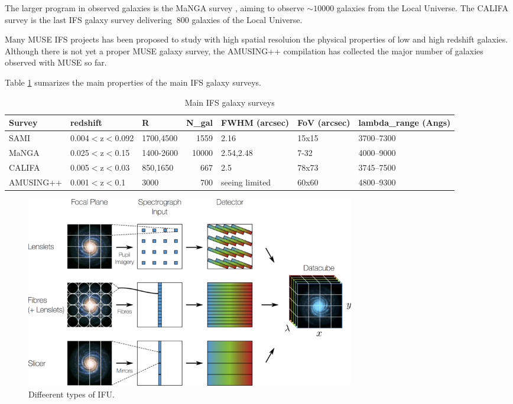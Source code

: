 The larger program in observed galaxies is the MaNGA survey \cite{mangaOLD}, aiming to observe $\sim 10000$ galaxies from the Local Universe. The CALIFA survey \cite{sanchez12a} is the last IFS galaxy
survey delivering $~800$ galaxies of the Local Universe. 

Many MUSE IFS projects has been proposed to study with high spatial resoluion the physical properties of low and high redshift galaxies. Although there is not yet a proper MUSE galaxy survey,
the AMUSING++ compilation has collected the major number of galaxies observed with MUSE so far. 

Table \ref{tab:IFS_properties} sumarizes the main properties of the main IFS galaxy surveys.

\begin{table} 
\begin{tabular}{lllrlll}
\toprule
 Survey    & redshift      & R         &   N\_gal & FWHM (arcsec)   & FoV (arcsec)   & lambda\_range (Angs)   \\
\midrule
 SAMI      & 0.004\ensuremath{<}z\ensuremath{<}0.092 & 1700,4500 &    1559 & 2.16            & 15x15          & 3700--7300            \\
 MaNGA     & 0.025\ensuremath{<}z\ensuremath{<}0.15  & 1400-2600 &   10000 & 2.54,2.48       & 7-32           & 4000--9000            \\
 CALIFA    & 0.005\ensuremath{<}z\ensuremath{<}0.03  & 850,1650  &     667 & 2.5             & 78x73          & 3745--7500            \\
 AMUSING++ & 0.001\ensuremath{<}z\ensuremath{<}0.1   & 3000      &     700 & seeing limited  & 60x60          & 4800--9300            \\
\bottomrule
\end{tabular}
\label{tab:IFS_properties}
\caption{Main IFS galaxy surveys}
\end{table} 


\begin{figure}
\centering\includegraphics[width=0.7\textwidth]{figures/ifs.png} 
\caption[]{Diffeerent types of IFU. }
\label{fig:ifs}
\end{figure}


